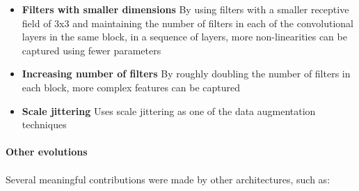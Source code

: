 \documentclass{article}
\begin{document}
\begin{itemize}
    \item \textbf{Filters with smaller dimensions} By using filters with a smaller receptive field of 3x3 and maintaining the number of filters in each of the convolutional layers in the same block, in a sequence of layers, more non-linearities can be captured using fewer parameters
 
    \item \textbf{Increasing number of filters} By roughly doubling the number of filters in each block, more complex features can be captured
    \item \textbf{Scale jittering} Uses scale jittering as one of the data augmentation techniques

\end{itemize}


\paragraph{Other evolutions}
\paragraph{}
Several meaningful contributions were made by other architectures, such as:
\end{document}
